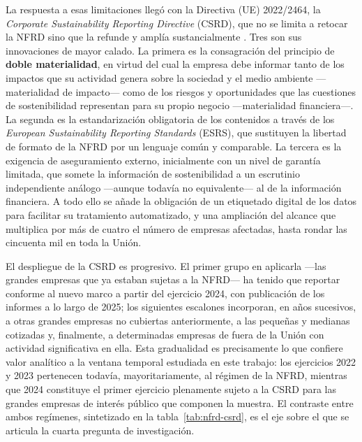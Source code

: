 La respuesta a esas limitaciones llegó con la Directiva (UE) 2022/2464, la
\textit{Corporate Sustainability Reporting Directive} (CSRD), que no se limita a retocar la
NFRD sino que la refunde y amplía sustancialmente \parencite{csrd2022}. Tres son sus
innovaciones de mayor calado. La primera es la consagración del principio de
\textbf{doble materialidad}, en virtud del cual la empresa debe informar tanto de los impactos
que su actividad genera sobre la sociedad y el medio ambiente —materialidad de impacto— como
de los riesgos y oportunidades que las cuestiones de sostenibilidad representan para su propio
negocio —materialidad financiera—. La segunda es la estandarización obligatoria de los
contenidos a través de los \textit{European Sustainability Reporting Standards} (ESRS), que
sustituyen la libertad de formato de la NFRD por un lenguaje común y comparable. La tercera es
la exigencia de aseguramiento externo, inicialmente con un nivel de garantía limitada, que
somete la información de sostenibilidad a un escrutinio independiente análogo —aunque todavía
no equivalente— al de la información financiera. A todo ello se añade la obligación de un
etiquetado digital de los datos para facilitar su tratamiento automatizado, y una ampliación
del alcance que multiplica por más de cuatro el número de empresas afectadas, hasta rondar las
cincuenta mil en toda la Unión.

El despliegue de la CSRD es progresivo. El primer grupo en aplicarla —las grandes empresas que
ya estaban sujetas a la NFRD— ha tenido que reportar conforme al nuevo marco a partir del
ejercicio 2024, con publicación de los informes a lo largo de 2025; los siguientes escalones
incorporan, en años sucesivos, a otras grandes empresas no cubiertas anteriormente, a las
pequeñas y medianas cotizadas y, finalmente, a determinadas empresas de fuera de la Unión con
actividad significativa en ella. Esta gradualidad es precisamente lo que confiere valor
analítico a la ventana temporal estudiada en este trabajo: los ejercicios 2022 y 2023
pertenecen todavía, mayoritariamente, al régimen de la NFRD, mientras que 2024 constituye el
primer ejercicio plenamente sujeto a la CSRD para las grandes empresas de interés público que
componen la muestra. El contraste entre ambos regímenes, sintetizado en la
tabla~\ref{tab:nfrd-csrd}, es el eje sobre el que se articula la cuarta pregunta de
investigación.

